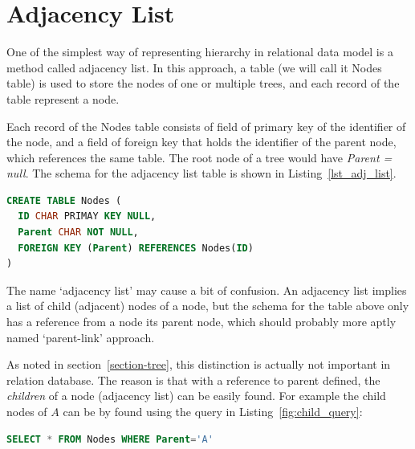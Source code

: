 
\section{Adjacency List}\label{sec-adj-list}

One of the simplest way of representing hierarchy in relational data model is a method called adjacency list. In this approach, a table (we will call it Nodes table) is used to store the nodes of one or multiple trees, and each record of the table represent a node.

Each record of the Nodes table consists of field of primary key of the identifier of the node, and a field of foreign key that holds the identifier of the parent node, which references the same table. The root node of a tree would have {\em Parent = null}. The schema for the adjacency list table is shown in Listing~\ref{lst_adj_list}.

\begin{lstlisting}[language=sql, caption=Schema for adjacency list, label=lst_adj_list]
CREATE TABLE Nodes (
  ID CHAR PRIMAY KEY NULL,
  Parent CHAR NOT NULL,
  FOREIGN KEY (Parent) REFERENCES Nodes(ID)
)
\end{lstlisting}

\begin{remark}[Note:] %

The name `adjacency list' may cause a bit of confusion. An adjacency list implies a list of child (adjacent) nodes of a node, but the schema for the table above only has a reference from a node its parent node, which should probably more aptly named `parent-link' approach.

As noted in section~\ref{section-tree}, this distinction is actually not important in relation database. The reason is that with a reference to parent defined, the {\em children} of a node (adjacency list) can be easily found. For example the child nodes of $A$ can be by found using the query in Listing~\ref{fig:child_query}:

\begin{lstlisting}[language=sql,caption=SQL for querying child nodes., label=fig:child_query]
SELECT * FROM Nodes WHERE Parent='A'
\end{lstlisting}

\end{remark} %


